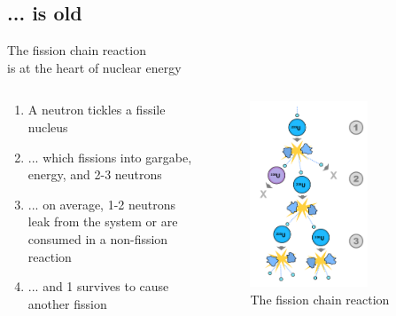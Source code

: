 \documentclass{beamer}
\begin{document}
    \subsection{... is old}

        \begin{frame}{The fission chain reaction \\ is at the heart of nuclear energy}

            \begin{columns}[T]

                \begin{column}{0.5\textwidth}
                    \begin{enumerate}
                        \item A neutron tickles a fissile nucleus
                        \pause
                        \item ... which fissions into gargabe, energy, and 2-3 neutrons
                        \pause
                        \item ... on average, 1-2 neutrons leak from the system or are consumed in a non-fission reaction
                        \pause
                        \item ... and 1 survives to cause another fission
                    \end{enumerate}
                \end{column}

                \begin{column}{0.5\textwidth}
                    \begin{figure}
                        \centering
                        \includegraphics[width=0.7\textwidth]{./img/chainReaction.pdf}
                        \caption*{The fission chain reaction}
                    \end{figure}
                \end{column}


\end{columns}
\end{frame}
\end{document}
